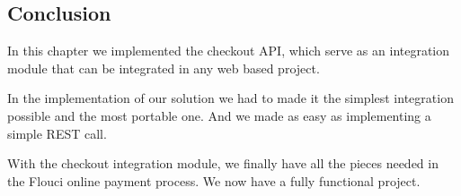 \begin{spacing}{1.2}
\section*{Conclusion}
In this chapter we implemented the checkout API, which serve as an integration module that can be integrated in any web based project.

In the implementation of our solution we had to made it the simplest integration possible and the most portable one. And we made as easy as implementing a simple REST call. 

With the checkout integration module, we finally have all the pieces needed in the Flouci online payment process. We now have a fully functional project.

\end{spacing}
